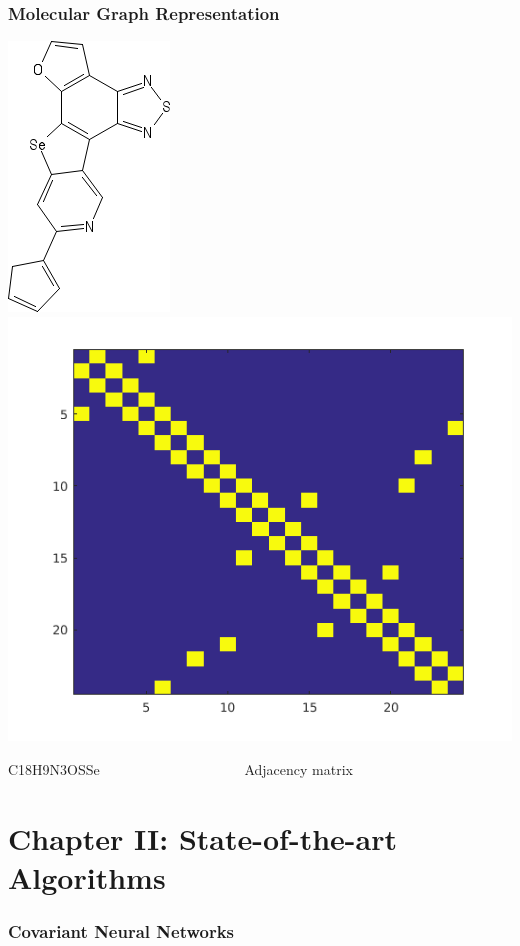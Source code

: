 \documentclass{beamer}
\begin{document}
\begin{frame}
\frametitle{Molecular Graph Representation}
\begin{justify}
\begin{center}
	\includegraphics[scale=0.5]{sketcher}
	\includegraphics[scale=0.5]{adjacency}
\end{center}
C18H9N3OSSe \ \ \ \ \ \ \ \ \ \ \ \ \ \ \ \ \ \ \ \ Adjacency matrix
\end{justify}
\end{frame}

\section{Chapter II: State-of-the-art Algorithms}

\begin{frame}
\frametitle{Covariant Neural Networks}
\end{frame}
\end{document}
